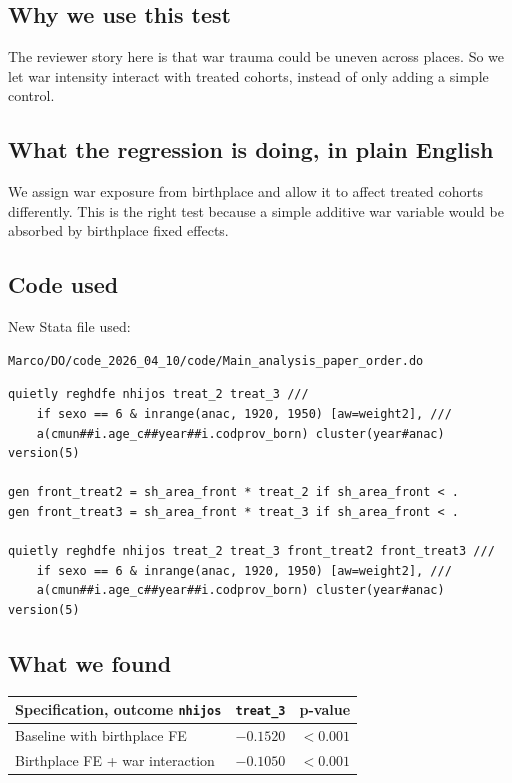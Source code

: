 \documentclass[11pt]{article}
\begin{document}
\subsection*{Why we use this test}

The reviewer story here is that war trauma could be uneven across places. So we let war intensity interact with treated cohorts, instead of only adding a simple control.

\subsection*{What the regression is doing, in plain English}

We assign war exposure from birthplace and allow it to affect treated cohorts differently. This is the right test because a simple additive war variable would be absorbed by birthplace fixed effects.

\subsection*{Code used}

New Stata file used:

\begin{verbatim}
Marco/DO/code_2026_04_10/code/Main_analysis_paper_order.do
\end{verbatim}

\begin{verbatim}
quietly reghdfe nhijos treat_2 treat_3 ///
    if sexo == 6 & inrange(anac, 1920, 1950) [aw=weight2], ///
    a(cmun##i.age_c##year##i.codprov_born) cluster(year#anac) version(5)

gen front_treat2 = sh_area_front * treat_2 if sh_area_front < .
gen front_treat3 = sh_area_front * treat_3 if sh_area_front < .

quietly reghdfe nhijos treat_2 treat_3 front_treat2 front_treat3 ///
    if sexo == 6 & inrange(anac, 1920, 1950) [aw=weight2], ///
    a(cmun##i.age_c##year##i.codprov_born) cluster(year#anac) version(5)
\end{verbatim}

\subsection*{What we found}

\begin{center}
\begin{tabular}{lcc}
\toprule
Specification, outcome \texttt{nhijos} & \texttt{treat\_3} & p-value \\
\midrule
Baseline with birthplace FE & $-0.1520$ & $< 0.001$ \\
Birthplace FE + war interaction & $-0.1050$ & $< 0.001$ \\
\bottomrule
\end{tabular}
\end{center}
\end{document}
